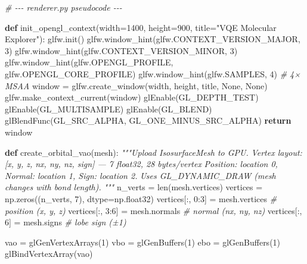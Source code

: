 \documentclass[
  11pt,
]{report}
\newenvironment{Shaded}{}{}
\newcommand{\BuiltInTok}[1]{\textcolor[rgb]{0.00,0.50,0.00}{#1}}
\newcommand{\CommentTok}[1]{\textcolor[rgb]{0.38,0.63,0.69}{\textit{#1}}}
\newcommand{\ControlFlowTok}[1]{\textcolor[rgb]{0.00,0.44,0.13}{\textbf{#1}}}
\newcommand{\DecValTok}[1]{\textcolor[rgb]{0.25,0.63,0.44}{#1}}
\newcommand{\KeywordTok}[1]{\textcolor[rgb]{0.00,0.44,0.13}{\textbf{#1}}}
\newcommand{\NormalTok}[1]{#1}
\newcommand{\OperatorTok}[1]{\textcolor[rgb]{0.40,0.40,0.40}{#1}}
\newcommand{\StringTok}[1]{\textcolor[rgb]{0.25,0.44,0.63}{#1}}
\newcommand{\VariableTok}[1]{\textcolor[rgb]{0.10,0.09,0.49}{#1}}
\begin{document}
\begin{Shaded}
\begin{Highlighting}[]
\CommentTok{\# {-}{-}{-} renderer.py pseudocode {-}{-}{-}}

\KeywordTok{def}\NormalTok{ init\_opengl\_context(width}\OperatorTok{=}\DecValTok{1400}\NormalTok{, height}\OperatorTok{=}\DecValTok{900}\NormalTok{, title}\OperatorTok{=}\StringTok{"VQE Molecular Explorer"}\NormalTok{):}
\NormalTok{    glfw.init()}
\NormalTok{    glfw.window\_hint(glfw.CONTEXT\_VERSION\_MAJOR, }\DecValTok{3}\NormalTok{)}
\NormalTok{    glfw.window\_hint(glfw.CONTEXT\_VERSION\_MINOR, }\DecValTok{3}\NormalTok{)}
\NormalTok{    glfw.window\_hint(glfw.OPENGL\_PROFILE, glfw.OPENGL\_CORE\_PROFILE)}
\NormalTok{    glfw.window\_hint(glfw.SAMPLES, }\DecValTok{4}\NormalTok{)        }\CommentTok{\# 4× MSAA}
\NormalTok{    window }\OperatorTok{=}\NormalTok{ glfw.create\_window(width, height, title, }\VariableTok{None}\NormalTok{, }\VariableTok{None}\NormalTok{)}
\NormalTok{    glfw.make\_context\_current(window)}
\NormalTok{    glEnable(GL\_DEPTH\_TEST)}
\NormalTok{    glEnable(GL\_MULTISAMPLE)}
\NormalTok{    glEnable(GL\_BLEND)}
\NormalTok{    glBlendFunc(GL\_SRC\_ALPHA, GL\_ONE\_MINUS\_SRC\_ALPHA)}
    \ControlFlowTok{return}\NormalTok{ window}


\KeywordTok{def}\NormalTok{ create\_orbital\_vao(mesh):}
    \CommentTok{"""Upload IsosurfaceMesh to GPU.}
\CommentTok{    Vertex layout: [x, y, z, nx, ny, nz, sign] — 7 float32, 28 bytes/vertex}
\CommentTok{    Position: location 0, Normal: location 1, Sign: location 2.}
\CommentTok{    Uses GL\_DYNAMIC\_DRAW (mesh changes with bond length).}
\CommentTok{    """}
\NormalTok{    n\_verts }\OperatorTok{=} \BuiltInTok{len}\NormalTok{(mesh.vertices)}
\NormalTok{    vertices }\OperatorTok{=}\NormalTok{ np.zeros((n\_verts, }\DecValTok{7}\NormalTok{), dtype}\OperatorTok{=}\NormalTok{np.float32)}
\NormalTok{    vertices[:, }\DecValTok{0}\NormalTok{:}\DecValTok{3}\NormalTok{] }\OperatorTok{=}\NormalTok{ mesh.vertices         }\CommentTok{\# position (x, y, z)}
\NormalTok{    vertices[:, }\DecValTok{3}\NormalTok{:}\DecValTok{6}\NormalTok{] }\OperatorTok{=}\NormalTok{ mesh.normals          }\CommentTok{\# normal (nx, ny, nz)}
\NormalTok{    vertices[:, }\DecValTok{6}\NormalTok{]   }\OperatorTok{=}\NormalTok{ mesh.signs            }\CommentTok{\# lobe sign (±1)}

\NormalTok{    vao }\OperatorTok{=}\NormalTok{ glGenVertexArrays(}\DecValTok{1}\NormalTok{)}
\NormalTok{    vbo }\OperatorTok{=}\NormalTok{ glGenBuffers(}\DecValTok{1}\NormalTok{)}
\NormalTok{    ebo }\OperatorTok{=}\NormalTok{ glGenBuffers(}\DecValTok{1}\NormalTok{)}
\NormalTok{    glBindVertexArray(vao)}


\end{Highlighting}
\end{Shaded}
\end{document}
